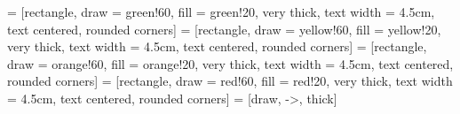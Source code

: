 \usetikzlibrary{shapes, arrows}
 = [rectangle, draw = green!60, fill = green!20, very thick, text width = 4.5cm, text centered, rounded corners]
 = [rectangle, draw = yellow!60, fill = yellow!20, very thick, text width = 4.5cm, text centered, rounded corners]
 = [rectangle, draw = orange!60, fill = orange!20, very thick, text width = 4.5cm, text centered, rounded corners]
 = [rectangle, draw = red!60, fill = red!20, very thick, text width = 4.5cm, text centered, rounded corners]
 = [draw, ->, thick]
\def\contra{
    \tikz[baseline, x = 0.22em, y=0.22em, line width = 0.032em]
    \draw (0,2.83)--(2.83,0) (0.71,3.54)--(3.54,0.71) (0,0.71)--(2.83,3.54) (0.71,0)--(3.54,2.83);
}